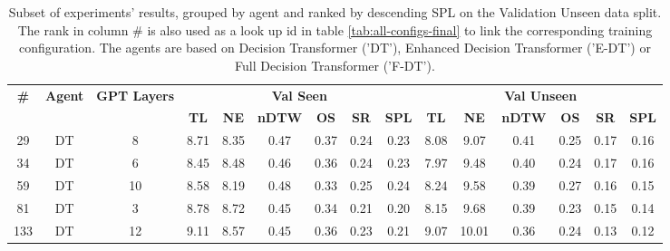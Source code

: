 \begin{table}
\centering
\caption{\label{tab:layers}Subset of experiments' results, grouped by agent and ranked by descending SPL on the Validation Unseen data split. The rank in column \# is also used as a look up id in table \ref{tab:all-configs-final} to link the corresponding training configuration.     \newline The agents are based on Decision Transformer ('DT'), Enhanced Decision Transformer ('E-DT') or Full Decision Transformer ('F-DT').}
\begin{tabular}{@{\hskip3pt}c@{\hskip3pt}c@{\hskip3pt}c@{\hskip3pt}c@{\hskip3pt}c@{\hskip3pt}c@{\hskip3pt}c@{\hskip3pt}c@{\hskip3pt}c@{\hskip3pt}c@{\hskip3pt}c@{\hskip3pt}c@{\hskip3pt}c@{\hskip3pt}c@{\hskip3pt}c}
\toprule
\textbf{\#} & \textbf{Agent} & \textbf{GPT Layers} & \multicolumn{6}{c}{\textbf{Val Seen}} & \multicolumn{6}{c}{\textbf{Val Unseen}} \\
 \textbf{~} &     \textbf{~} &          \textbf{~} &       \textbf{TL} & \textbf{NE} & \textbf{nDTW} & \textbf{OS} & \textbf{SR} & \textbf{SPL} &         \textbf{TL} & \textbf{NE} & \textbf{nDTW} & \textbf{OS} & \textbf{SR} & \textbf{SPL} \\
\midrule
         29 &             DT &                   8 &              8.71 &        8.35 &          0.47 &        0.37 &        0.24 &         0.23 &                8.08 &        9.07 &          0.41 &        0.25 &        0.17 &         0.16 \\
         34 &             DT &                   6 &              8.45 &        8.48 &          0.46 &        0.36 &        0.24 &         0.23 &                7.97 &        9.48 &          0.40 &        0.24 &        0.17 &         0.16 \\
         59 &             DT &                  10 &              8.58 &        8.19 &          0.48 &        0.33 &        0.25 &         0.24 &                8.24 &        9.58 &          0.39 &        0.27 &        0.16 &         0.15 \\
         81 &             DT &                   3 &              8.78 &        8.72 &          0.45 &        0.34 &        0.21 &         0.20 &                8.15 &        9.68 &          0.39 &        0.23 &        0.15 &         0.14 \\
        133 &             DT &                  12 &              9.11 &        8.57 &          0.45 &        0.36 &        0.23 &         0.21 &                9.07 &       10.01 &          0.36 &        0.24 &        0.13 &         0.12 \\

\end{tabular}
\end{table}
